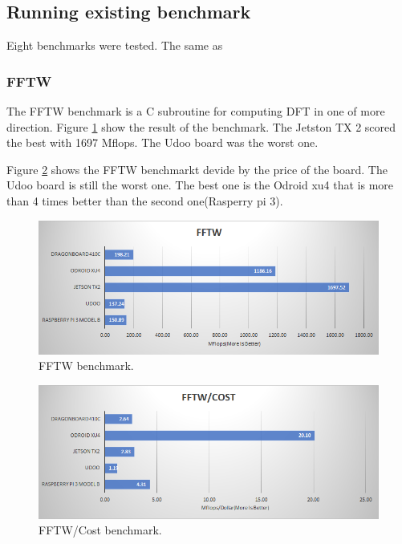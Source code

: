 \documentclass[english]{book_template} %
\begin{document}
\subsection{Running existing benchmark}

Eight benchmarks were tested. The same as\cite{Benchmar96:online} 


\subsubsection{FFTW}

The FFTW benchmark is a C subroutine for computing DFT in one of more direction. 
Figure \ref{fig:FFTW} show the result of the benchmark. The Jetston TX 2 scored the best with 1697 Mflops. The Udoo board was the worst one. 

Figure \ref{fig:FFTW_cost} shows the FFTW benchmarkt devide by the price of the board. The Udoo board is still the worst one. The best one is the Odroid xu4 that is more than 4 times better than the second one(Rasperry pi 3).
 
\begin{figure}[H]
\center
\caption{FFTW benchmark.\label{fig:FFTW}}
\includegraphics[scale=1]{./resultphoronix/fftw.png}
\end{figure} 

\begin{figure}[H]
\center
\caption{FFTW/Cost benchmark.\label{fig:FFTW_cost}}
\includegraphics[scale=1]{./resultphoronix/fftw_cost.png}
\end{figure} 
\end{document}
